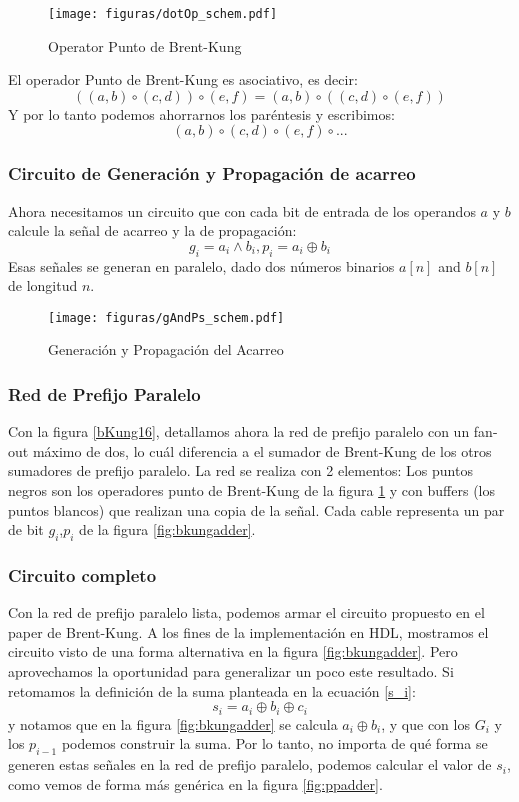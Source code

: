 \begin{figure}[h!]
  \centering
\texttt{[image: figuras/dotOp\_schem.pdf]}
  \caption{Operator Punto de Brent-Kung}
  \label{dotOp}
\end{figure}
El operador Punto de Brent-Kung es asociativo, es decir:
$$((a,b) \circ( c,d))\circ (e,f)  = (a,b)\circ((c,d)\circ(e,f))$$
Y por lo tanto podemos ahorrarnos los paréntesis y escribimos:
$$(a,b)\circ(c,d)\circ(e,f)\circ...$$

\subsubsection {Circuito de Generación y Propagación de acarreo}
Ahora necesitamos un circuito que con cada bit de entrada de los operandos \(a\) y \(b\) calcule la señal de acarreo y la de propagación:
$$g_i=a_i \wedge b_i, p_i=a_i\oplus b_i$$
Esas señales se generan en paralelo, dado dos números binarios \(a[n]\) and \(b[n]\) de longitud \(n\).


\begin{figure}[h!]
  \centering
\texttt{[image: figuras/gAndPs\_schem.pdf]}
  \caption{Generación y Propagación del Acarreo}
  \label{gAndPs}
\end{figure}

\subsubsection {Red de Prefijo Paralelo}
\noindent Con la figura \ref{bKung16}, detallamos ahora la red de prefijo paralelo con un fan-out máximo de dos, lo cuál diferencia a el sumador de Brent-Kung de los otros sumadores de prefijo paralelo. La red se realiza con 2 elementos: Los puntos negros son los operadores punto de Brent-Kung de la figura \ref{dotOp} y con buffers (los puntos blancos) que realizan una copia de la señal. Cada cable representa un par de bit \(g_i\),\(p_i\) de la figura \ref{fig:bkungadder}.

\subsubsection {Circuito completo}
Con la red de prefijo paralelo lista, podemos armar el circuito propuesto en el paper de Brent-Kung\cite{brent-kung}. A los fines de la implementación en HDL, mostramos el circuito visto de una forma alternativa en la figura \ref{fig:bkungadder}. Pero aprovechamos la oportunidad para generalizar un poco este resultado. Si retomamos la definición de la suma planteada en la ecuación \ref{s_i}:
$$
s_i = a_i \oplus b_i\oplus c_i
$$
y notamos que en la figura \ref{fig:bkungadder} se calcula $a_i \oplus b_i$, y que con los $G_i$ y los $p_{i-1}$ podemos construir la suma. Por lo tanto, no importa de qué forma se generen estas señales en la red de prefijo paralelo, podemos calcular el valor de $s_i$, como vemos de forma más genérica en la figura \ref{fig:ppadder}.

